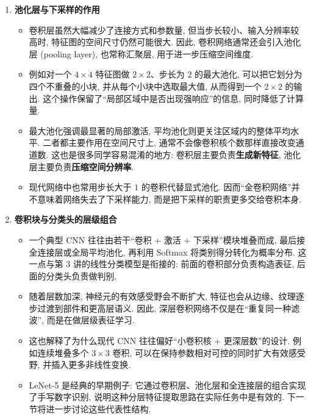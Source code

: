 \documentclass{../nndlcourse}
\begin{document}
\begin{enumerate}
\begin{center}
        {\small 图示: 多个卷积核生成多个输出通道, 再沿通道维堆叠.}
    \end{center}

    图中强调了一个容易混淆的点: 输出通道数由卷积核组数决定, 而不是由输入通道数自动继承; 但每一个输出通道都会综合全部输入通道的信息.

    \item \textbf{池化层与下采样的作用}
    \begin{itemize}
        \item 卷积层虽然大幅减少了连接方式和参数量, 但当步长较小、输入分辨率较高时, 特征图的空间尺寸仍然可能很大. 因此, 卷积网络通常还会引入池化层 (pooling layer), 也常称汇聚层, 用于进一步压缩空间维度.
        \item 例如对一个 $4 \times 4$ 特征图做 $2 \times 2$、步长为 $2$ 的最大池化, 可以把它划分为四个不重叠的小块, 并从每个小块中选取最大值, 从而得到一个 $2 \times 2$ 的输出. 这个操作保留了“局部区域中是否出现强响应”的信息, 同时降低了计算量.
        \item 最大池化强调最显著的局部激活, 平均池化则更关注区域内的整体平均水平. 二者都主要作用在空间尺寸上, 通常不会像卷积核个数那样直接改变通道数. 这也是很多同学容易混淆的地方: 卷积层主要负责\textbf{生成新特征}, 池化层主要负责\textbf{压缩空间分辨率}.
        \item 现代网络中也常用步长大于 $1$ 的卷积代替显式池化. 因而“全卷积网络”并不意味着网络失去了下采样能力, 而是把下采样的职责更多交给卷积本身.
    \end{itemize}

    \item \textbf{卷积块与分类头的层级组合}
    \begin{itemize}
        \item 一个典型 CNN 往往由若干“卷积 + 激活 + 下采样”模块堆叠而成, 最后接全连接层或全局平均池化, 再利用 Softmax 将类别得分转化为概率分布. 这一点与第 3 讲的线性分类模型是衔接的: 前面的卷积部分负责构造表征, 后面的分类头负责做判别.
        \item 随着层数加深, 神经元的有效感受野会不断扩大, 特征也会从边缘、纹理逐步过渡到部件和更高层语义. 因此, 深层卷积网络不仅是在“重复同一种滤波”, 而是在做层级表征学习.
        \item 这也解释了为什么现代 CNN 往往偏好“小卷积核 + 更深层数”的设计. 例如连续堆叠多个 $3 \times 3$ 卷积, 可以在保持参数相对可控的同时扩大有效感受野, 并插入更多非线性变换.
        \item LeNet-5 是经典的早期例子: 它通过卷积层、池化层和全连接层的组合实现了手写数字识别, 说明这种分层特征提取思路在实际任务中是有效的. 下一节将进一步讨论这些代表性结构.
    \end{itemize}


\end{enumerate}
\end{document}
